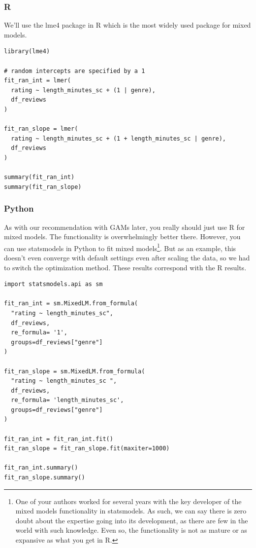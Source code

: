\documentclass[
  letterpaper,
]{krantz}
\begin{document}
\subsubsection{R}

We'll use the {lme4} package in R which is the most widely used package
for mixed models.

\begin{verbatim}
library(lme4)

# random intercepts are specified by a 1
fit_ran_int = lmer(
  rating ~ length_minutes_sc + (1 | genre), 
  df_reviews
)

fit_ran_slope = lmer(
  rating ~ length_minutes_sc + (1 + length_minutes_sc | genre), 
  df_reviews
)

summary(fit_ran_int)
summary(fit_ran_slope)
\end{verbatim}

\subsubsection{Python}

As with our recommendation with GAMs later, you really should just use R
for mixed models. The functionality is overwhelmingly better there.
However, you can use {statsmodels} in Python to fit mixed
models\footnote{One of your authors worked for several years with the
  key developer of the mixed models functionality in {statsmodels}. As
  such, we can say there is zero doubt about the expertise going into
  its development, as there are few in the world with such knowledge.
  Even so, the functionality is not as mature or as expansive as what
  you get in R.}. But as an example, this doesn't even converge with
default settings even after scaling the data, so we had to switch the
optimization method. These results correspond with the R results.

\begin{verbatim}
import statsmodels.api as sm

fit_ran_int = sm.MixedLM.from_formula(
  "rating ~ length_minutes_sc", 
  df_reviews, 
  re_formula= '1',
  groups=df_reviews["genre"]
)

fit_ran_slope = sm.MixedLM.from_formula(
  "rating ~ length_minutes_sc ", 
  df_reviews, 
  re_formula= 'length_minutes_sc',
  groups=df_reviews["genre"]  
)

fit_ran_int = fit_ran_int.fit()
fit_ran_slope = fit_ran_slope.fit(maxiter=1000)

fit_ran_int.summary()
fit_ran_slope.summary()
\end{verbatim}
\end{document}
